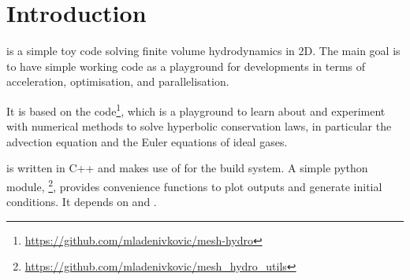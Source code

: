 \newpage


\section{Introduction}


\hydro is a simple toy code solving finite volume hydrodynamics in 2D. The main
goal is to have simple working code as a playground for developments in terms of
acceleration, optimisation, and parallelisation.

It is based on the 
code\footnote{\url{https://github.com/mladenivkovic/mesh-hydro}}, which is a
playground to learn about and experiment with numerical methods to solve
hyperbolic conservation laws, in particular the advection equation and the Euler
equations of ideal gases.

\hydro is written in C++ and makes use of  for the build system.
A simple python module, \mhutils\footnote{
\url{https://github.com/mladenivkovic/mesh\_hydro\_utils}}, provides convenience
functions to plot outputs and generate initial conditions. It depends on
 and .


